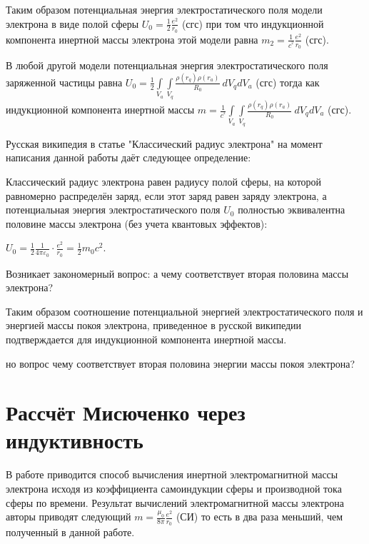 \documentclass{article}
\begin{document}
Таким образом потенциальная энергия электростатического поля модели электрона в виде полой сферы
${U}_{0} =\frac{1}{2}\frac{e^2}{{{r}_{0}}}$ (сгс)
при том что индукционной компонента инертной массы электрона этой модели равна
$m_2 =\frac{1}{{{c}^{^{2}}}}\frac{e^2}{{{r}_{0}}}$ (сгс).

В любой другой модели потенциальная энергия электростатического поля заряженной частицы равна
${U}_{0}=\frac{1}{2}\int\limits_{{{V}_{a}}}{\int\limits_{{{V}_{q}}}{\frac{\rho \left( {{r}_{q}} \right)\rho \left( {{r}_{a}} \right)}{R_{0}}}}\ d{{V}_{q}}d{{V}_{a}}$ (сгс)
тогда как индукционной компонента инертной массы
$m=\frac{1}{{{c}^{^{2}}}}\int\limits_{{{V}_{a}}}{\int\limits_{{{V}_{q}}}{\frac{\rho \left( {{r}_{q}} \right)\rho \left( {{r}_{a}} \right)}{R_{0}}}}\ d{{V}_{q}}d{{V}_{a}}$ (сгс).

Русская википедия в статье "Классический радиус электрона"  на момент написания данной работы даёт следующее определение:

Классический радиус электрона равен радиусу полой сферы, на которой равномерно распределён заряд, если этот заряд равен заряду электрона, а потенциальная энергия электростатического поля ${U}_{0}$ полностью эквивалентна половине массы электрона (без учета квантовых эффектов):

${\displaystyle U_{0}={\frac {1}{2}}{\frac {1}{4\pi \varepsilon _{0}}}\cdot {\frac {e^{2}}{r_{0}}}={\frac {1}{2}}m_{0}c^{2}}$.

Возникает закономерный вопрос: а чему соответствует вторая половина массы электрона?


Таким образом соотношение потенциальной энергией электростатического поля и энергией массы покоя электрона, приведенное в русской википедии подтверждается для индукционной компонента инертной массы.

но вопрос чему соответствует вторая половина энергии массы покоя электрона?

\section{Рассчёт Мисюченко через индуктивность}

В работе \cite{misyuchenko} приводится способ вычисления инертной электромагнитной массы электрона исходя из коэффициента самоиндукции сферы и производной тока сферы по времени. Результат вычислений электромагнитной массы электрона авторы приводят следующий $m =\frac{{{\mu }_{0}}}{8\pi }\frac{e^2}{{{r}_{0}}}$ (СИ) то есть в два раза меньший, чем полученный в данной работе.
\end{document}

